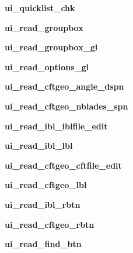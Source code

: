 \begin{DoxyCompactItemize}
{\bfseries ui\+\_\+quicklist\+\_\+chk}
\item 
\hypertarget{a00075_afd5486e4e3b6a77faf883e45beab9a09}{}\label{a00075_afd5486e4e3b6a77faf883e45beab9a09} 
{\bfseries ui\+\_\+read\+\_\+groupbox}
\item 
\hypertarget{a00075_ad90bdfb90daa3db5b3f49ae0b8d8fa8e}{}\label{a00075_ad90bdfb90daa3db5b3f49ae0b8d8fa8e} 
{\bfseries ui\+\_\+read\+\_\+groupbox\+\_\+gl}
\item 
\hypertarget{a00075_a7704bdcb5a1c0e19f4cd1c19c2000b62}{}\label{a00075_a7704bdcb5a1c0e19f4cd1c19c2000b62} 
{\bfseries ui\+\_\+read\+\_\+options\+\_\+gl}
\item 
\hypertarget{a00075_a7bfc8ae9b8e66f044f312dbb91219d88}{}\label{a00075_a7bfc8ae9b8e66f044f312dbb91219d88} 
{\bfseries ui\+\_\+read\+\_\+cftgeo\+\_\+angle\+\_\+dspn}
\item 
\hypertarget{a00075_a96dfb7bb6ab5a36c649090a3d1178c74}{}\label{a00075_a96dfb7bb6ab5a36c649090a3d1178c74} 
{\bfseries ui\+\_\+read\+\_\+cftgeo\+\_\+nblades\+\_\+spn}
\item 
\hypertarget{a00075_a28522bd8330277ba8a1f01fa736cc82f}{}\label{a00075_a28522bd8330277ba8a1f01fa736cc82f} 
{\bfseries ui\+\_\+read\+\_\+ibl\+\_\+iblfile\+\_\+edit}
\item 
\hypertarget{a00075_a297dda79cc86d653c2ba1f5bdef3b70e}{}\label{a00075_a297dda79cc86d653c2ba1f5bdef3b70e} 
{\bfseries ui\+\_\+read\+\_\+ibl\+\_\+lbl}
\item 
\hypertarget{a00075_a5da571d939521a997ec7b05cd5bd7091}{}\label{a00075_a5da571d939521a997ec7b05cd5bd7091} 
{\bfseries ui\+\_\+read\+\_\+cftgeo\+\_\+cftfile\+\_\+edit}
\item 
\hypertarget{a00075_abcf4d4a107f41021d2904f09770d747b}{}\label{a00075_abcf4d4a107f41021d2904f09770d747b} 
{\bfseries ui\+\_\+read\+\_\+cftgeo\+\_\+lbl}
\item 
\hypertarget{a00075_a94bf4df4cc948d1a55752fa45b97099b}{}\label{a00075_a94bf4df4cc948d1a55752fa45b97099b} 
{\bfseries ui\+\_\+read\+\_\+ibl\+\_\+rbtn}
\item 
\hypertarget{a00075_a3ccbf6ded4e6de7d70da7777441a3227}{}\label{a00075_a3ccbf6ded4e6de7d70da7777441a3227} 
{\bfseries ui\+\_\+read\+\_\+cftgeo\+\_\+rbtn}
\item 
\hypertarget{a00075_a94ac3b9c86462bc353b5c9a53b961a7d}{}\label{a00075_a94ac3b9c86462bc353b5c9a53b961a7d} 
{\bfseries ui\+\_\+read\+\_\+find\+\_\+btn}
\item 
\hypertarget{a00075_a16200a07fd06dae2ce5c12674d04b497}{}\label{a00075_a16200a07fd06dae2ce5c12674d04b497} 

\end{DoxyCompactItemize}

